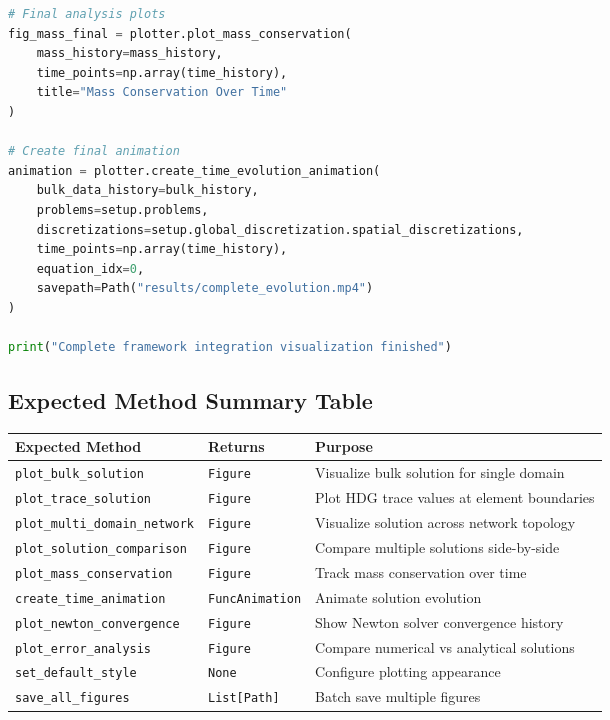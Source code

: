 \begin{lstlisting}[language=Python, caption=Expected Framework Integration]
# Final analysis plots
fig_mass_final = plotter.plot_mass_conservation(
    mass_history=mass_history,
    time_points=np.array(time_history),
    title="Mass Conservation Over Time"
)

# Create final animation
animation = plotter.create_time_evolution_animation(
    bulk_data_history=bulk_history,
    problems=setup.problems,
    discretizations=setup.global_discretization.spatial_discretizations,
    time_points=np.array(time_history),
    equation_idx=0,
    savepath=Path("results/complete_evolution.mp4")
)

print("Complete framework integration visualization finished")
\end{lstlisting}

\subsection{Expected Method Summary Table}
\label{subsec:expected_method_summary}

\begin{longtable}{|p{5cm}|p{3cm}|p{6.5cm}|}
\hline
\textbf{Expected Method} & \textbf{Returns} & \textbf{Purpose} \\
\hline
\endhead

\texttt{plot\_bulk\_solution} & \texttt{Figure} & Visualize bulk solution for single domain \\
\hline

\texttt{plot\_trace\_solution} & \texttt{Figure} & Plot HDG trace values at element boundaries \\
\hline

\texttt{plot\_multi\_domain\_network} & \texttt{Figure} & Visualize solution across network topology \\
\hline

\texttt{plot\_solution\_comparison} & \texttt{Figure} & Compare multiple solutions side-by-side \\
\hline

\texttt{plot\_mass\_conservation} & \texttt{Figure} & Track mass conservation over time \\
\hline

\texttt{create\_time\_animation} & \texttt{FuncAnimation} & Animate solution evolution \\
\hline

\texttt{plot\_newton\_convergence} & \texttt{Figure} & Show Newton solver convergence history \\
\hline

\texttt{plot\_error\_analysis} & \texttt{Figure} & Compare numerical vs analytical solutions \\
\hline

\texttt{set\_default\_style} & \texttt{None} & Configure plotting appearance \\
\hline

\texttt{save\_all\_figures} & \texttt{List[Path]} & Batch save multiple figures \\
\hline

\end{longtable}

